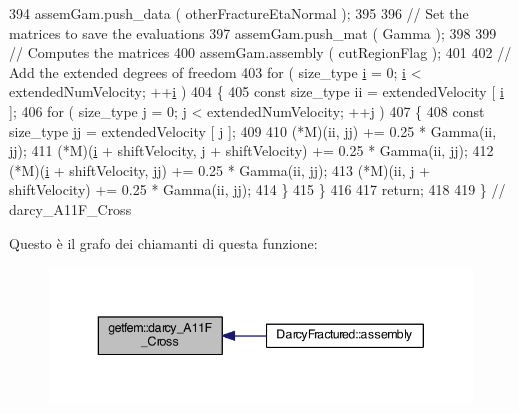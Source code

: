 \begin{DoxyCode}
394     assemGam.push\_data ( otherFractureEtaNormal );
395 
396     \textcolor{comment}{// Set the matrices to save the evaluations}
397     assemGam.push\_mat ( Gamma  );
398 
399     \textcolor{comment}{// Computes the matrices}
400     assemGam.assembly ( cutRegionFlag );
401 
402     \textcolor{comment}{// Add the extended degrees of freedom}
403     \textcolor{keywordflow}{for} ( size\_type \hyperlink{matrici_8m_a6f6ccfcf58b31cb6412107d9d5281426}{i} = 0; \hyperlink{matrici_8m_a6f6ccfcf58b31cb6412107d9d5281426}{i} < extendedNumVelocity; ++\hyperlink{matrici_8m_a6f6ccfcf58b31cb6412107d9d5281426}{i} )
404     \{
405         \textcolor{keyword}{const} size\_type ii = extendedVelocity [ \hyperlink{matrici_8m_a6f6ccfcf58b31cb6412107d9d5281426}{i} ];
406         \textcolor{keywordflow}{for} ( size\_type j = 0; j < extendedNumVelocity; ++j )
407         \{
408             \textcolor{keyword}{const} size\_type jj = extendedVelocity [ j ];
409 
410             (*M)(ii, jj) += 0.25 * Gamma(ii, jj);
411             (*M)(\hyperlink{matrici_8m_a6f6ccfcf58b31cb6412107d9d5281426}{i} + shiftVelocity, j + shiftVelocity) += 0.25 * Gamma(ii, jj);
412             (*M)(\hyperlink{matrici_8m_a6f6ccfcf58b31cb6412107d9d5281426}{i} + shiftVelocity, jj) += 0.25 * Gamma(ii, jj);
413             (*M)(ii, j + shiftVelocity) += 0.25 * Gamma(ii, jj);
414         \}
415     \}
416 
417     \textcolor{keywordflow}{return};
418     
419 \} \textcolor{comment}{// darcy\_A11F\_Cross}
\end{DoxyCode}


Questo è il grafo dei chiamanti di questa funzione\-:\nopagebreak
\begin{figure}[H]
\begin{center}
\leavevmode
\includegraphics[width=343pt]{namespacegetfem_a9b6ded8fe1019aa04e66d2047d0f29dd_icgraph}
\end{center}
\end{figure}


